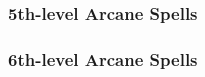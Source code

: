 \subsubsection{5th-level Arcane Spells} 
\begin{swspelllist}

    \SLdelaydamage[Abjur]
    \SLfireshield
    \SLretributivebrilliance
    \SLspelltheft*

    \SLblacktentacles[Conj]
    \SLstinkingcloud
    \SLsummonmonsterv
    \SLwallofstone
    \SLretrievegreater*

    \SLprecognition[Div]
    \SLforesight
    \SLtelepathy
    \SLmanipulateprobability*

    \SLfear[Ench]
    \SLphantasmalmaze
    \SLcharmmonster*

    \SLchainlightning[Evoc]
    \SLconeofcold
    \SLfireshield
    \SLresilientsphere
    \SLtelekineticthrust*

    \SLmirrorimagegreater[Illus]
    \SLphantasmalmaze
    \SLretributivebrilliance

    \SLinflictlightwounds[Necro]
    \SLwavesoffatigue
    \SLdrainlife*

    \SLdelaydamage[Trans]
    \SLtotemicmindgreater
    \SLtotemicpowergreater
    \SLwallofstone
    \SLreducepersonmass*

    \SLprismaticwall[Univ]
\end{swspelllist}

\subsubsection{6th-level Arcane Spells} 
\begin{swspelllist}

    \SLbanishment[Abjur]
    \SLdispelmagicgreater
    \SLprotectionfromenergygreater
    \SLrepulsion
    \SLprohibition*

    \SLacidarrow[Conj]
    \SLbanishment
    \SLsolidfog
    \SLsummonmonstervi
    \SLetherealjaunt*

    \SLlocateentity[Div]
    \SLtrueseeing
    \SLtruestrike
    \SLmomentofprescience*

    \SLinsanity[Ench]
    \SLpowerwordconfuse
    \SLdiscordantsong
    \SLcharmpersonmass*

    \SLdelayedblastfireball[Evoc]
    \SLgraspinghand
    \SLwallofforce
    \SLtelekinesis*

    \SLmislead[Illus]
    \SLinvisibilitygreater
    \SLpersistentimage*

    \SLcripple[Necro]
    \SLharm
    \SLinflictmoderatewoundsmass

    \SLdisintegrate[Trans]
    \SLtotemicmindmass
    \SLtotemicpowermass
    \SLtransmutefleshandstone
    \SLenlargepersonmass*
    \SLslowmass*

\end{swspelllist}

